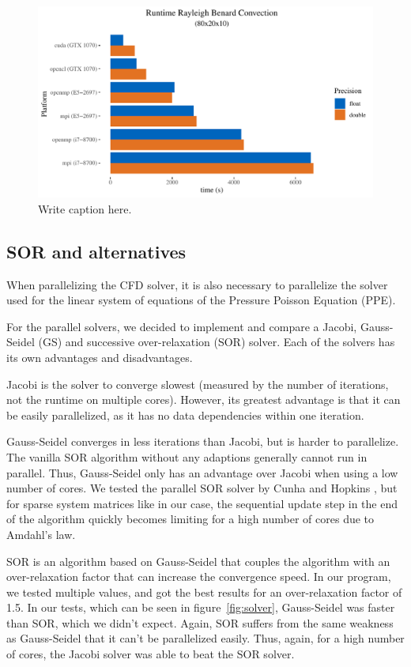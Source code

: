 \documentclass{article}%
\begin{document}
\begin{figure}[htb]
\centering
\includegraphics[width=1\linewidth]{../tests/graphs/runtime_rayleigh_benard_convection_8-2-1_platforms.pdf}
\caption{Write caption here.}
\label{fig:platforms}
\end{figure}

\subsection{SOR and alternatives}
When parallelizing the CFD solver, it is also necessary to parallelize the solver used for the linear system of equations of the Pressure Poisson Equation (PPE).

For the parallel solvers, we decided to implement and compare a Jacobi, Gauss-Seidel (GS) and successive over-relaxation (SOR) solver. Each of the solvers has its own advantages and disadvantages.

Jacobi is the solver to converge slowest (measured by the number of iterations, not the runtime on multiple cores). However, its greatest advantage is that it can be easily parallelized, as it has no data dependencies within one iteration.

Gauss-Seidel converges in less iterations than Jacobi, but is harder to parallelize. The vanilla SOR algorithm without any adaptions generally cannot run in parallel. Thus, Gauss-Seidel only has an advantage over Jacobi when using a low number of cores. We tested the parallel SOR solver by Cunha and Hopkins \cite{parallel-sor}, but for sparse system matrices like in our case, the sequential update step in the end of the algorithm quickly becomes limiting for a high number of cores due to Amdahl’s law.

SOR is an algorithm based on Gauss-Seidel that couples the algorithm with an over-relaxation factor that can increase the convergence speed. In our program, we tested multiple values, and got the best results for an over-relaxation factor of 1.5. In our tests, which can be seen in figure~\ref{fig:solver}, Gauss-Seidel was faster than SOR, which we didn't expect. Again, SOR suffers from the same weakness as Gauss-Seidel that it can’t be parallelized easily. Thus, again, for a high number of cores, the Jacobi solver was able to beat the SOR solver.
\end{document}
